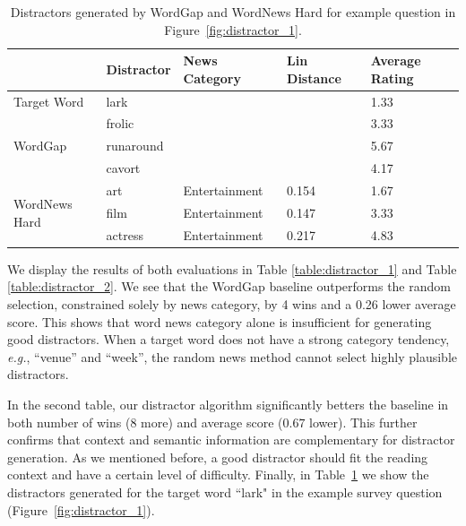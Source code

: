 \begin{table}[ht]
\caption{Distractors generated by WordGap and WordNews Hard for example question in Figure~\ref{fig:distractor_1}.} 
\label{table:example_distractors}
\centering
\begin{tabular}{|l|l|l|l|l|}
\hline
                              & {\bf Distractor} & {\bf News Category} & {\bf Lin Distance} & {\bf Average Rating} \\ \hline
Target Word                   & lark       &               &              & 1.33       \\ \hline
\multirow{3}{*}{WordGap}      & frolic     &               &              & 3.33       \\ \cline{2-5} 
                              & runaround  &               &              & 5.67       \\ \cline{2-5} 
                              & cavort     &               &              & 4.17       \\ \hline
\multirow{3}{*}{WordNews Hard} & art        & Entertainment & 0.154        & 1.67       \\ \cline{2-5} 
                              & film       & Entertainment & 0.147        & 3.33       \\ \cline{2-5} 
                              & actress    & Entertainment & 0.217        & 4.83       \\ \hline
\end{tabular}
\end{table}

We display the results of both evaluations in Table
\ref{table:distractor_1} and Table \ref{table:distractor_2}.  We see
that the WordGap baseline outperforms the random selection,
constrained solely by news category, by 4 wins and a 0.26 lower
average score.  This shows that word news category alone is
insufficient for generating good distractors.  When a target word does
not have a strong category tendency, {\it e.g.}, ``venue'' and
``week'', the random news method cannot select highly plausible
distractors. 

In the second table, our distractor algorithm significantly betters
the baseline in both number of wins (8 more) and average score ($0.67$
lower).  This further confirms that context and semantic information
are complementary for distractor generation. As we mentioned before, a
good distractor should fit the reading context and have a certain
level of difficulty.
Finally, in Table~\ref{table:example_distractors} we show the distractors generated for the target word “lark" in the example survey question (Figure~\ref{fig:distractor_1}).



